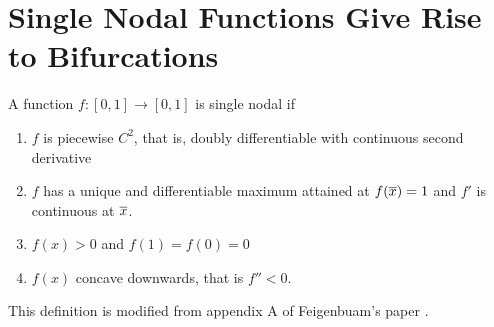 \section{Single Nodal Functions Give Rise to Bifurcations}

\begin{defn}
	A function $f: [0,1] \rightarrow [0,1]$ is single nodal if 
	\begin{enumerate}
		\item $f$ is piecewise $C^2$, that is, doubly differentiable with continuous second derivative
		\item $f$ has a unique and differentiable maximum attained at $f(\overline{x}) = 1$ and $f'$ is continuous at $\overline{x}$.
		\item $f(x) > 0$ and $f(1) = f(0) =0$
		\item $f(x)$ concave downwards, that is $f'' < 0$.
	\end{enumerate}

	This definition is modified from appendix A of Feigenbuam's paper \cite{F1}.
\end{defn}

